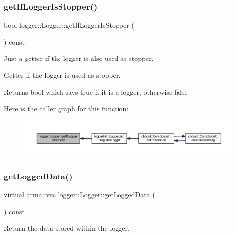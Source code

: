 \subsubsection{\texorpdfstring{get\+If\+Logger\+Is\+Stopper()}{getIfLoggerIsStopper()}}
{\footnotesize\ttfamily bool logger\+::\+Logger\+::get\+If\+Logger\+Is\+Stopper (\begin{DoxyParamCaption}{ }\end{DoxyParamCaption}) const}



Just a getter if the logger is also used as stopper. 

Getter if the logger is used as stopper.

\begin{DoxyReturn}{Returns}
{\ttfamily bool} which says {\ttfamily true} if it is a logger, otherwise {\ttfamily false} 
\end{DoxyReturn}
Here is the caller graph for this function\+:\nopagebreak
\begin{figure}[H]
\begin{center}
\leavevmode
\includegraphics[width=350pt]{classlogger_1_1_logger_ae39cfa15ba833840ae52889c09cac994_icgraph}
\end{center}
\end{figure}
\mbox{\label{classlogger_1_1_logger_aa4fc254c532172db3404b7c0bcd17092}} 
\subsubsection{\texorpdfstring{get\+Logged\+Data()}{getLoggedData()}}
{\footnotesize\ttfamily virtual arma\+::vec logger\+::\+Logger\+::get\+Logged\+Data (\begin{DoxyParamCaption}{ }\end{DoxyParamCaption}) const\hspace{0.3cm}{\ttfamily [pure virtual]}}



Return the data stored within the logger. 



